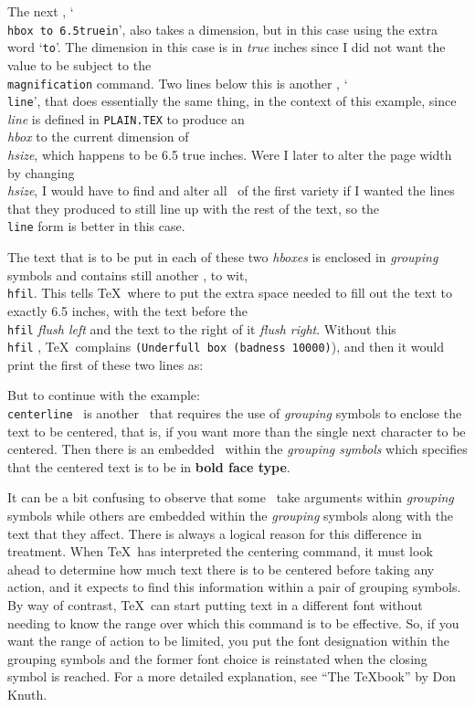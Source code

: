 The next \cs, `{\tt \\hbox to 6.5truein}', also takes a dimension, but in this case
using the extra word `{\tt to}'. The dimension in this case
is in {\sl true} inches since I did not want the value to be subject to the
{\tt \\magnification} command.  Two lines below this is another \cs, `{\tt
\\line}', that does essentially the same thing, in the context of this
example, since {\sl \\line} is defined in {\tt PLAIN.TEX} to produce an {\sl \\hbox}
to the current dimension of {\sl \\hsize}, which
happens to be 6.5 true inches.
Were I later to alter
the page width by changing {\sl \\hsize}, I would have to find and
alter all \css\/\ of the first variety if I wanted the lines that they produced
to still line up with the rest of the text, so the {\tt \\line} form is better in
this case.

The text that is to be put in each of these two {\sl hboxes} is enclosed
in {\sl grouping} symbols and contains still another \cs, to wit, {\tt
\\hfil}. This tells \TeX\ where to put the extra space needed to fill out
the text to exactly 6.5 inches, with the text before the {\tt \\hfil}
{\sl flush left} and the text to the right of it {\sl flush right}.
Without this {\tt \\hfil} \cs, \TeX\
complains {\tt (Underfull box (badness 10000)}), and then it would print the
first of these two lines as:\hfil\break
{}

But to continue with the example: {\tt \\centerline} \ is
another \cs\/\ that
requires the use of {\sl grouping} symbols to enclose the text to be
centered, that is, if you want more than the single next character to be
centered.  Then there is an embedded \cs\/\ within the {\sl grouping
symbols} which specifies that the centered text is to be in {\bf bold face
type}.

It can be a bit confusing to observe that some \css\/\ take arguments
within {\sl grouping} symbols while others are embedded within the {\sl
grouping} symbols along with the text that they affect. There is always a
logical reason for this difference in treatment.  When \TeX\ has
interpreted the centering command, it must look ahead to determine how
much text there is to be centered before taking any action, and it expects
to find this information within a pair of grouping symbols.  By way of
contrast, \TeX\ can start putting text in a different font without needing
to know the range over which this command is to be effective. So, if you
want the range of action to be limited, you put the font designation
within the grouping symbols and the former font choice is reinstated when
the closing symbol is reached.  For a more detailed
explanation, see ``The \TeX book'' by Don Knuth.

